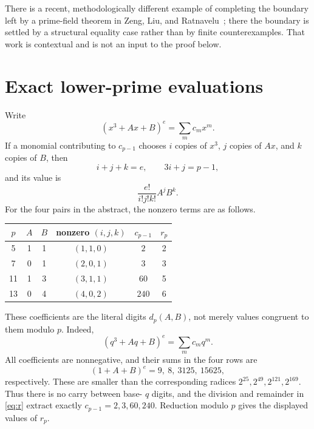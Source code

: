 \documentclass[11pt]{article}
\begin{document}
There is a recent, methodologically different example of completing the
boundary left by a prime-field theorem in
Zeng, Liu, and Ratnavelu~\cite{ZengLiuRatnavelu2026}; there the boundary is
settled by a structural equality case rather than by finite counterexamples.
That work is contextual and is not an input to the proof below.

\section{Exact lower-prime evaluations}

Write
\[
 (x^3+Ax+B)^e=\sum_m c_mx^m.
\]
If a monomial contributing to \(c_{p-1}\) chooses \(i\) copies of \(x^3\),
\(j\) copies of \(Ax\), and \(k\) copies of \(B\), then
\begin{equation}
 i+j+k=e,\qquad 3i+j=p-1,                                      \label{eq:constraints}
\end{equation}
and its value is
\begin{equation}
 \frac{e!}{i!j!k!}A^jB^k.                                     \label{eq:multinomial}
\end{equation}
For the four pairs in the abstract, the nonzero terms are as follows.

\begin{center}
\begin{tabular}{@{}cccccc@{}}
\toprule
\(p\) & \(A\) & \(B\) & nonzero \((i,j,k)\) & \(c_{p-1}\) & \(r_p\) \\
\midrule
5  & 1 & 1 & \((1,1,0)\) & \(2\)   & 2 \\
7  & 0 & 1 & \((2,0,1)\) & \(3\)   & 3 \\
11 & 1 & 3 & \((3,1,1)\) & \(60\)  & 5 \\
13 & 0 & 4 & \((4,0,2)\) & \(240\) & 6 \\
\bottomrule
\end{tabular}
\end{center}

These coefficients are the literal digits \(d_p(A,B)\), not merely values
congruent to them modulo \(p\).  Indeed,
\[
 (q^3+Aq+B)^e=\sum_m c_mq^m.
\]
All coefficients are nonnegative, and their sums in the four rows are
\[
 (1+A+B)^e=9,\ 8,\ 3125,\ 15625,
\]
respectively.  These are smaller than the corresponding radices
\(2^{25},2^{49},2^{121},2^{169}\).  Thus there is no carry between base-
\(q\) digits, and the division and remainder in \eqref{eq:r} extract exactly
\(c_{p-1}=2,3,60,240\).  Reduction modulo \(p\) gives the displayed values of
\(r_p\).
\end{document}
